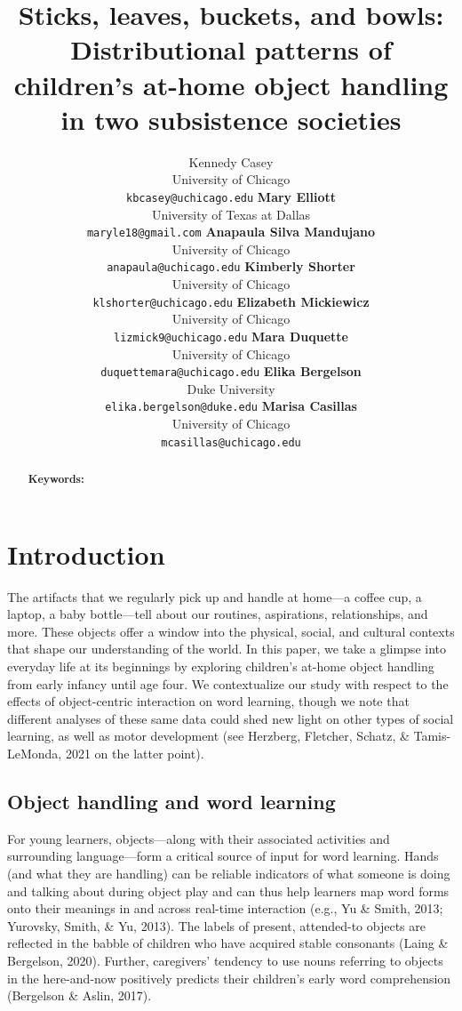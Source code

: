 \documentclass[10pt, letterpaper]{article}
\title{Sticks, leaves, buckets, and bowls: Distributional patterns of
children's at-home object handling in two subsistence societies}
\author{Kennedy Casey \\
        University of Chicago \\
        \texttt{\small{kbcasey@uchicago.edu}}
\And \textbf{Mary Elliott} \\
             University of Texas at Dallas \\
             \texttt{\small{maryle18@gmail.com}}
\And \textbf{Anapaula Silva Mandujano} \\
             University of Chicago \\
             \texttt{\small{anapaula@uchicago.edu}}   
\And \textbf{Kimberly Shorter} \\
             University of Chicago \\
             \texttt{\small{klshorter@uchicago.edu}}
\AND \textbf{Elizabeth Mickiewicz} \\
             University of Chicago \\
             \texttt{\small{lizmick9@uchicago.edu}}         
\And \textbf{Mara Duquette} \\
             University of Chicago \\
             \texttt{\small{duquettemara@uchicago.edu}}
\And \textbf{Elika Bergelson} \\
             Duke University \\
             \texttt{\small{elika.bergelson@duke.edu}}
\And \textbf{Marisa Casillas} \\
             University of Chicago \\
             \texttt{\small{mcasillas@uchicago.edu}}}
\begin{document}
\maketitle

\begin{abstract}


\textbf{Keywords:}

\end{abstract}

\hypertarget{introduction}{%
\section{Introduction}\label{introduction}}

The artifacts that we regularly pick up and handle at home---a coffee
cup, a laptop, a baby bottle---tell about our routines, aspirations,
relationships, and more. These objects offer a window into the physical,
social, and cultural contexts that shape our understanding of the world.
In this paper, we take a glimpse into everyday life at its beginnings by
exploring children's at-home object handling from early infancy until
age four. We contextualize our study with respect to the effects of
object-centric interaction on word learning, though we note that
different analyses of these same data could shed new light on other
types of social learning, as well as motor development (see Herzberg,
Fletcher, Schatz, \& Tamis-LeMonda, 2021 on the latter point).

\hypertarget{object-handling-and-word-learning}{%
\subsection{Object handling and word
learning}\label{object-handling-and-word-learning}}

For young learners, objects---along with their associated activities and
surrounding language---form a critical source of input for word
learning. Hands (and what they are handling) can be reliable indicators
of what someone is doing and talking about during object play and can
thus help learners map word forms onto their meanings in and across
real-time interaction (e.g., Yu \& Smith, 2013; Yurovsky, Smith, \& Yu,
2013). The labels of present, attended-to objects are reflected in the
babble of children who have acquired stable consonants (Laing \&
Bergelson, 2020). Further, caregivers' tendency to use nouns referring
to objects in the here-and-now positively predicts their children's
early word comprehension (Bergelson \& Aslin, 2017).
\end{document}
